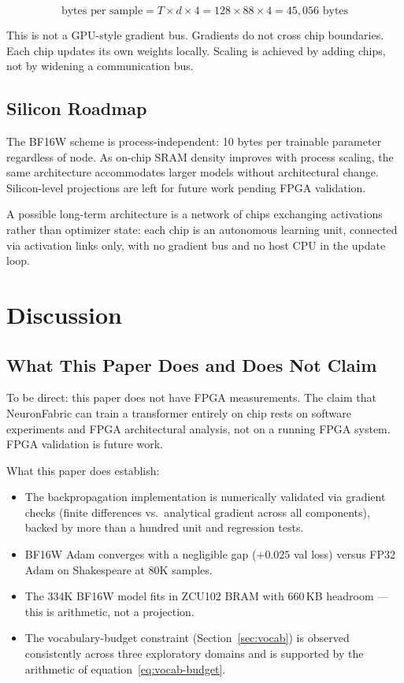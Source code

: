 \documentclass[11pt]{article}
\newcommand{\bfsixteenloss}{0.025}
\begin{document}
\begin{equation}
\text{bytes per sample} = T \times d \times 4 = 128 \times 88 \times 4 = 45{,}056 \text{ bytes}
\end{equation}

This is not a GPU-style gradient bus. Gradients do not cross chip boundaries.
Each chip updates its own weights locally. Scaling is achieved by adding chips,
not by widening a communication bus.

\subsection{Silicon Roadmap}

The BF16W scheme is process-independent: 10 bytes per trainable parameter regardless of node.
As on-chip SRAM density improves with process scaling, the same architecture accommodates
larger models without architectural change. Silicon-level projections are left for future work
pending FPGA validation.

A possible long-term architecture is a network of chips exchanging activations rather
than optimizer state: each chip is an autonomous learning unit, connected via activation
links only, with no gradient bus and no host CPU in the update loop.

\section{Discussion}

\subsection{What This Paper Does and Does Not Claim}

To be direct: this paper does not have FPGA measurements. The claim that NeuronFabric
can train a transformer entirely on chip rests on software experiments and FPGA
architectural analysis, not on a running FPGA system. FPGA validation is future work.

What this paper does establish:

\begin{itemize}
  \item The backpropagation implementation is numerically validated via gradient checks
    (finite differences vs.\ analytical gradient across all components), backed by more
    than a hundred unit and regression tests.
  \item BF16W Adam converges with a negligible gap ($+\bfsixteenloss$ val loss) versus FP32 Adam on Shakespeare at 80K samples.
  \item The 334K BF16W model fits in ZCU102 BRAM with 660\,KB headroom --- this is
    arithmetic, not a projection.
  \item The vocabulary-budget constraint (Section~\ref{sec:vocab}) is observed consistently across three exploratory domains and is supported by the arithmetic of equation~\ref{eq:vocab-budget}.
\end{itemize}
\end{document}
